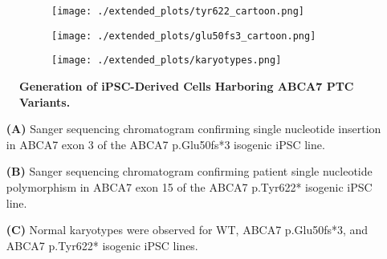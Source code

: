 \begin{figure}[H]
    \begin{subfigure}[t]{0.4\textwidth}
        \caption{}
        \hspace{1.5cm}
        \texttt{[image: ./extended\_plots/tyr622\_cartoon.png]}        
    \end{subfigure}  
    \hspace{1.5cm}
    \begin{subfigure}[t]{0.4\textwidth}
        \caption{}
        \texttt{[image: ./extended\_plots/glu50fs3\_cartoon.png]}        
    \end{subfigure}  
    \par
    \begin{subfigure}[t]{0.9\textwidth}
        \caption{}
        \hspace{1.5cm}
        \texttt{[image: ./extended\_plots/karyotypes.png]}        
    \end{subfigure}  
    \caption{
        \textbf{Generation of iPSC-Derived Cells Harboring ABCA7 PTC Variants.}\\
    }
    \label{fig:ipsc_lines}
\end{figure}
\begin{itemize}
    \item[\textbf{(A)}] Sanger sequencing chromatogram confirming single nucleotide insertion in ABCA7 exon 3 of the ABCA7 p.Glu50fs*3 isogenic iPSC line.
    \item[\textbf{(B)}] Sanger sequencing chromatogram confirming patient single nucleotide polymorphism in ABCA7 exon 15 of the ABCA7 p.Tyr622* isogenic iPSC line. 
    \item[\textbf{(C)}] Normal karyotypes were observed for WT, ABCA7 p.Glu50fs*3, and ABCA7 p.Tyr622* isogenic iPSC lines. 
\end{itemize}